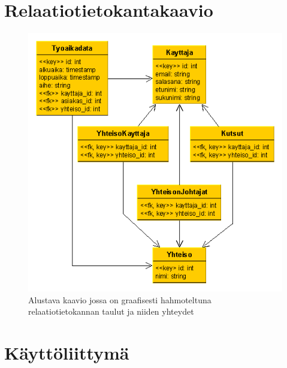 \documentclass[a4paper, 12pt finnish]{article}
\begin{document}
\section{Relaatiotietokantakaavio}
\begin{figure}[htbp]
    \centering
    \includegraphics[width=1\textwidth]{relaatiokaavio.png}
    \caption{\small Alustava kaavio jossa on graafisesti hahmoteltuna
    relaatiotietokannan taulut ja niiden yhteydet}
\end{figure}

\section{Käyttöliittymä}
\end{document}
